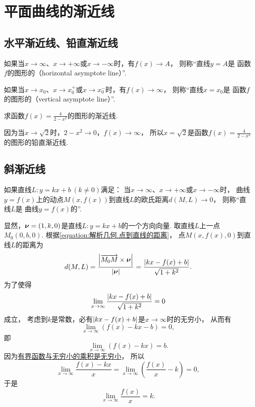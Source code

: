\section{平面曲线的渐近线}
\subsection{水平渐近线、铅直渐近线}
如果当\(x\to\infty\)、\(x\to+\infty\)或\(x\to-\infty\)时，有\(f(x) \to A\)，
则称“直线\(y = A\)是
函数\(f\)的图形的（horizontal asymptote line）”.

如果当\(x \to x_0\)、\(x \to x_0^+\)或\(x \to x_0^-\)时，有\(f(x) \to \infty\)，
则称“直线\(x = x_0\)是
函数\(f\)的图形的（vertical asymptote line）”.

\begin{example}
求函数\(f(x)=\frac4{2-x^2}\)的图形的渐近线.
\begin{solution}
因为当\(x\to\sqrt2\)时，\(2-x^2\to0\)，\(f(x)\to\infty\)，
所以\(x=\sqrt2\)是函数\(f(x)=\frac4{2-x^2}\)的图形的铅直渐近线.
\end{solution}
\end{example}

\subsection{斜渐近线}
如果直线\(L: y = kx+b\ (k \neq 0)\)满足：
当\(x\to\infty\)、\(x\to+\infty\)或\(x\to-\infty\)时，
曲线\(y = f(x)\)上的动点\(M(x,f(x))\)到直线\(L\)的欧氏距离\(d(M,L)\to0\)，
则称“直线\(L\)是
曲线\(y = f(x)\)的”.

显然，\(\boldsymbol{\nu}=(1,k,0)\)是直线\(L: y=kx+b\)的一个方向向量.
取直线\(L\)上一点\(M_0(0,b,0)\).
根据\cref{equation:解析几何.点到直线的距离}，
点\(M(x,f(x),0)\)到直线\(L\)的距离为\begin{equation*}
	d(M,L)=\frac{\abs{\overrightarrow{M_0M}\times\boldsymbol{\nu}}}{\abs{\boldsymbol{\nu}}}
	=\frac{
		\abs{kx-f(x)+b}
	}{
		\sqrt{1+k^2}
	}.
\end{equation*}
为了使得\begin{equation*}
	\lim_{x\to\infty} \frac{\abs{kx-f(x)+b}}{\sqrt{1+k^2}} = 0
\end{equation*}成立，
考虑到\(k\)是常数，必有\(\abs{kx-f(x)+b}\)是\(x\to\infty\)时的无穷小，
从而有\begin{equation*}
	\lim_{x\to\infty} (f(x)-kx-b) = 0,
\end{equation*}
即\begin{equation*}
	\lim_{x\to\infty} (f(x)-kx) = b.
\end{equation*}
因为\hyperref[theorem:函数极限.无穷小.有界函数与无穷小的乘积是无穷小]{有界函数与无穷小的乘积是无穷小}，
所以\begin{equation*}
	\lim_{x\to\infty} \frac{f(x)-kx}{x}
	= \lim_{x\to\infty} \left( \frac{f(x)}x-k \right)
	= 0,
\end{equation*}
于是\begin{equation*}
	\lim_{x\to\infty} \frac{f(x)}{x} = k.
\end{equation*}

